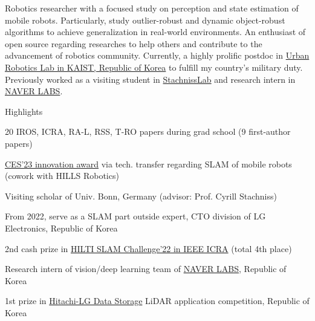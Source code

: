 

\begin{cvparagraph}

Robotics researcher with a focused study on perception and state estimation of mobile robots.
Particularly, study outlier-robust and dynamic object-robust algorithms to achieve generalization in real-world environments.
An enthusiast of open source regarding researches to help others and contribute to the advancement of robotics community.
Currently, a highly prolific postdoc in \href{https://urobot.kaist.ac.kr/}{Urban Robotics Lab in KAIST, Republic of Korea} to fulfill my country's military duty.
Previously worked as a visiting student in \href{https://www.ipb.uni-bonn.de/}{StachnissLab} and research intern in \href{https://www.naverlabs.com/}{NAVER LABS}.
\end{cvparagraph}

\newcommand{\lineintv}{\vspace{0.0cm}} %

\cventry
  {} %
  {Highlights\vspace{-0.3cm}} %
  {} %
  {} %
  {
    \begin{cvitems} %
      \item {20 IROS, ICRA, RA-L, RSS, T-RO papers during grad school (9 first-author papers)\lineintv}
      \item {\href{https://www.ces.tech/innovation-awards/honorees/2023/honorees/h/hi-bot-hologram-image-guide-robot.aspx}{CES'23 innovation award} via tech. transfer regarding SLAM of mobile robots (cowork with HILLS Robotics)\lineintv}
      \item {Visiting scholar of Univ. Bonn, Germany (advisor: Prof. Cyrill Stachniss)\lineintv}
      \item {From 2022, serve as a SLAM part outside expert, CTO division of LG Electronics, Republic of Korea\lineintv}
      \item {2nd cash prize in \href{https://hilti-challenge.com/}{HILTI SLAM Challenge'22 in IEEE ICRA} (total 4th place)\lineintv}
      \item {Research intern of vision/deep learning team of \href{https://www.naverlabs.com/}{NAVER LABS}, Republic of Korea\lineintv}
      \item {1st prize in \href{https://hitachi-lg.com/}{Hitachi-LG Data Storage} LiDAR application competition, Republic of Korea\lineintv}
    \end{cvitems}
  }


